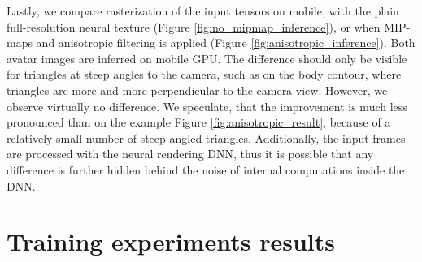 Lastly, we compare rasterization of the input tensors on mobile, with the plain full-resolution neural texture (Figure \ref{fig:no_mipmap_inference}), or when MIP-maps and anisotropic filtering is applied (Figure \ref{fig:anisotropic_inference}). Both avatar images are inferred on mobile GPU. The difference should only be visible for triangles at steep angles to the camera, such as on the body contour, where triangles are more and more perpendicular to the camera view. However, we observe virtually no difference. We speculate, that the improvement is much less pronounced than on the example Figure \ref{fig:anisotropic_result}, because of a relatively small number of steep-angled triangles. Additionally, the input frames are processed with the neural rendering  DNN, thus it is possible that any difference is further hidden behind the noise of internal computations inside the DNN.

\section{Training experiments results}\label{res:training}



